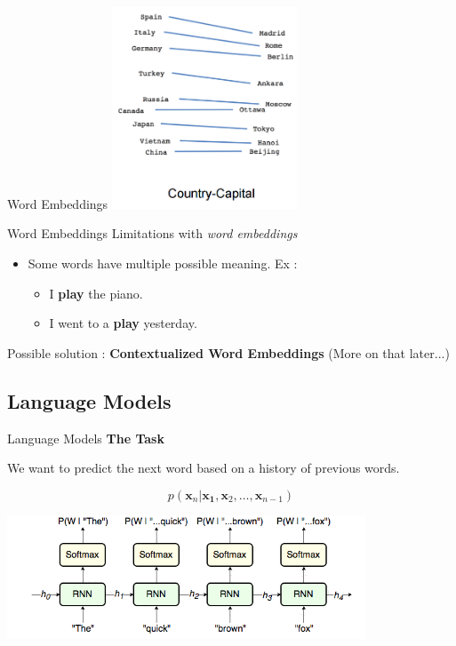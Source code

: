 \documentclass[aspectratio=169]{beamer}
\begin{document}
\begin{frame}{Word Embeddings}
\centering
\includegraphics[height=6cm]{figures/capital_country.png}

\end{frame}

\begin{frame}{Word Embeddings}
Limitations with \textit{word embeddings}
\vspace{.3cm}

\begin{itemize}
	\item Some words have multiple possible meaning. Ex :
	\begin{itemize}
		\item I \textbf{play} the piano.
		\item I went to a \textbf{play} yesterday.
	\end{itemize}
\end{itemize}
\vspace{.3cm}

Possible solution : \textbf{Contextualized Word Embeddings} (More on that later...)
\end{frame}

\subsection{Language Models}

\begin{frame}{Language Models}
\centering
\textbf{The Task}
\vspace{.3cm}

\raggedright
We want to predict the next word based on a history of previous words.

$$
p(\mathbf{x}_n | \mathbf{x_1}, \mathbf{x}_2, \dots, \mathbf{x}_{n-1})
$$
\vspace{.3cm}
\centering

\includegraphics[width=0.8\textwidth]{figures/rnn_language_model}

\end{frame}
\end{document}
